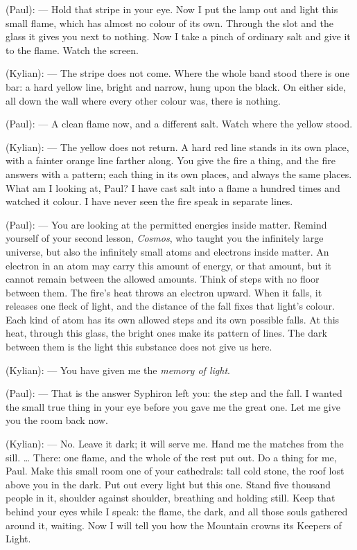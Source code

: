 \begin{room}
(Paul): --- Hold that stripe in your eye. Now I put the lamp out and light this small flame, which has almost no colour of its own. Through the slot and the glass it gives you next to nothing. Now I take a pinch of ordinary salt and give it to the flame. Watch the screen.

(Kylian): --- The stripe does not come. Where the whole band stood there is one bar: a hard yellow line, bright and narrow, hung upon the black. On either side, all down the wall where every other colour was, there is nothing.

(Paul): --- A clean flame now, and a different salt. Watch where the yellow stood.

(Kylian): --- The yellow does not return. A hard red line stands in its own place, with a fainter orange line farther along. You give the fire a thing, and the fire answers with a pattern; each thing in its own places, and always the same places. What am I looking at, Paul? I have cast salt into a flame a hundred times and watched it colour. I have never seen the fire speak in separate lines.

(Paul): --- You are looking at the permitted energies inside matter. Remind yourself of your second lesson, \textit{Cosmos}, who taught you the infinitely large universe, but also the infinitely small atoms and electrons inside matter. An electron in an atom may carry this amount of energy, or that amount, but it cannot remain between the allowed amounts. Think of steps with no floor between them. The fire's heat throws an electron upward. When it falls, it releases one fleck of light, and the distance of the fall fixes that light's colour. Each kind of atom has its own allowed steps and its own possible falls. At this heat, through this glass, the bright ones make its pattern of lines. The dark between them is the light this substance does not give us here.

(Kylian): --- You have given me the \textit{memory of light}.

(Paul): --- That is the answer Syphiron left you: the step and the fall. I wanted the small true thing in your eye before you gave me the great one. Let me give you the room back now.

(Kylian): --- No. Leave it dark; it will serve me. Hand me the matches from the sill. \ldots{} There: one flame, and the whole of the rest put out. Do a thing for me, Paul. Make this small room one of your cathedrals: tall cold stone, the roof lost above you in the dark. Put out every light but this one. Stand five thousand people in it, shoulder against shoulder, breathing and holding still. Keep that behind your eyes while I speak: the flame, the dark, and all those souls gathered around it, waiting. Now I will tell you how the Mountain crowns its Keepers of Light.

\end{room}

